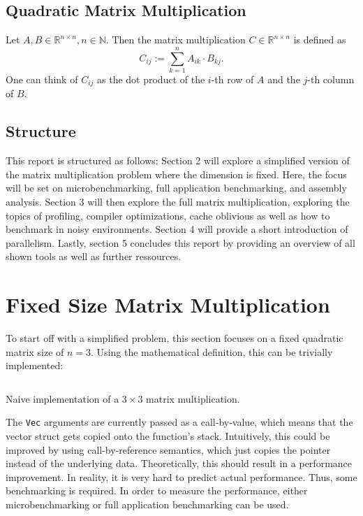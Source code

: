 \subsection{Quadratic Matrix Multiplication}

Let $A, B \in \mathbb{R}^{n\times n}, n \in \mathbb{N}$. Then the matrix multiplication $C \in \mathbb{R}^{n \times n}$ is defined as
\[
  C_{ij} := \sum_{k=1}^n A_{ik} \cdot B_{kj}.
\]
One can think of $C_{ij}$ as the dot product of the $i$-th row of $A$ and the $j$-th column of $B$.

\subsection{Structure}
This report is structured as follows: Section 2 will explore a simplified version of the matrix multiplication problem where the dimension is fixed. Here, the focus will be set on microbenchmarking, full application benchmarking, and assembly analysis. Section 3 will then explore the full matrix multiplication, exploring the topics of profiling, compiler optimizations, cache oblivious as well as how to benchmark in noisy environments. Section 4 will provide a short introduction of parallelism. Lastly, section 5 concludes this report by providing an overview of all shown tools as well as further ressources.

\section{Fixed Size Matrix Multiplication}
To start off with a simplified problem, this section focuses on a fixed quadratic matrix size of $n=3$. Using the mathematical definition, this can be trivially implemented:

\begin{listing}[H]
  \inputminted{rust}{./assets/first_impl.rs}
\caption{Naive implementation of a $3\times3$ matrix multiplication.}
\end{listing}

The \texttt{Vec} arguments are currently passed as a call-by-value, which means that the vector struct gets copied onto the function's stack. Intuitively, this could be improved by using call-by-reference semantics, which just copies the pointer instead of the underlying data. Theoretically, this should result in a performance improvement. In reality, it is very hard to predict actual performance. Thus, some benchmarking is required. In order to measure the performance, either microbenchmarking or full application benchmarking can be used.

